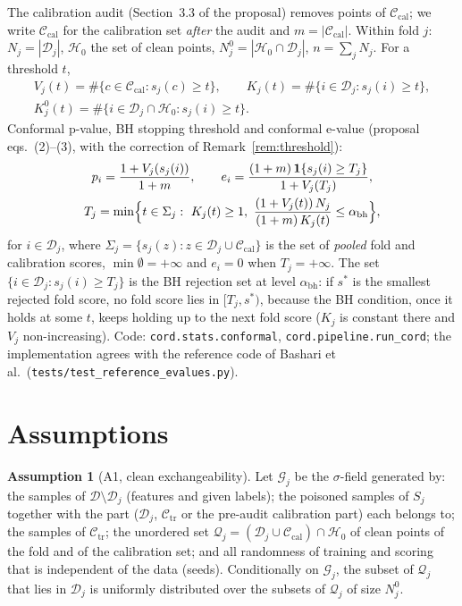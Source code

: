 \documentclass[11pt]{article}
\theoremstyle{definition}
\newtheorem{assumption}{Assumption}
\theoremstyle{remark}
\newcommand{\Cal}{\mathcal{C}_{\mathrm{cal}}}
\newcommand{\Ctr}{\mathcal{C}_{\mathrm{tr}}}
\newcommand{\D}{\mathcal{D}}
\newcommand{\G}{\mathcal{G}}
\newcommand{\Q}{\mathcal{Q}}
\newcommand{\Hnull}{\mathcal{H}_0}
\newcommand{\1}{\mathbf{1}}
\begin{document}
The calibration audit (Section~3.3 of the proposal) removes points of $\Cal$; we write $\Cal$ for
the calibration set \emph{after} the audit and $m=|\Cal|$. Within fold $j$: $N_j=|\D_j|$, $\Hnull$
the set of clean points, $N_j^0=|\Hnull\cap\D_j|$, $n=\sum_j N_j$. For a threshold $t$,
\begin{gather*}
V_j(t)=\#\{c\in\Cal: s_j(c)\ge t\},\qquad K_j(t)=\#\{i\in\D_j: s_j(i)\ge t\},\\
K^0_j(t)=\#\{i\in\D_j\cap\Hnull: s_j(i)\ge t\}.
\end{gather*}
Conformal p-value, BH stopping threshold and conformal e-value (proposal eqs.~(2)--(3), with the
correction of Remark~\ref{rem:threshold}):
\begin{gather*}
p_i=\frac{1+V_j(s_j(i))}{1+m},\qquad
e_i=\frac{(1+m)\,\1\{s_j(i)\ge T_j\}}{1+V_j(T_j)},\\
T_j=\min\Bigl\{t\in\Sigma_j:\ K_j(t)\ge1,\ \frac{(1+V_j(t))\,N_j}{(1+m)\,K_j(t)}\le\alpha_{\mathrm{bh}}\Bigr\},
\end{gather*}
for $i\in\D_j$, where $\Sigma_j=\{s_j(z):z\in\D_j\cup\Cal\}$ is the set of \emph{pooled} fold and
calibration scores, $\min\emptyset=+\infty$ and $e_i=0$ when $T_j=+\infty$. The set
$\{i\in\D_j:s_j(i)\ge T_j\}$ is the BH rejection set at level $\alpha_{\mathrm{bh}}$: if $s^\ast$ is the
smallest rejected fold score, no fold score lies in $[T_j,s^\ast)$, because the BH condition, once
it holds at some $t$, keeps holding up to the next fold score ($K_j$ is constant there and $V_j$
non-increasing). Code:
\texttt{cord.stats.conformal}, \texttt{cord.pipeline.run\_cord}; the implementation agrees with
the reference code of Bashari et al.\ (\texttt{tests/test\_reference\_evalues.py}).

\section{Assumptions}

\begin{assumption}[A1, clean exchangeability]\label{as:A1}
Let $\G_j$ be the $\sigma$-field generated by: the samples of $\D\setminus\D_j$ (features and
given labels); the poisoned samples of $S_j$ together with the part ($\D_j$, $\Ctr$ or the
pre-audit calibration part) each belongs to; the samples of $\Ctr$; the unordered set
$\Q_j=(\D_j\cup\Cal)\cap\Hnull$ of clean points of the fold and of the calibration set; and all
randomness of training and scoring that is independent of the data (seeds). Conditionally on
$\G_j$, the subset of $\Q_j$ that lies in $\D_j$ is uniformly distributed over the subsets of
$\Q_j$ of size $N_j^0$.
\end{assumption}
\end{document}
